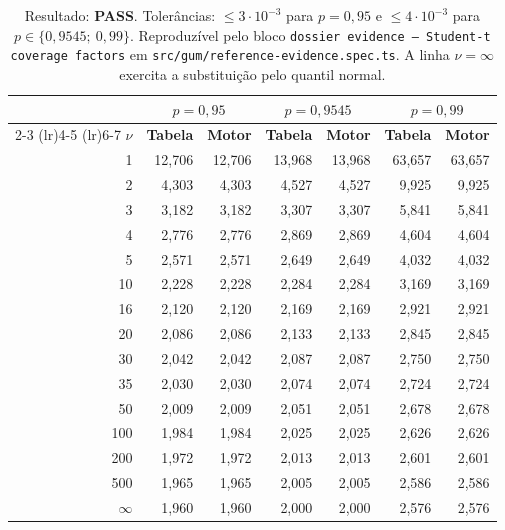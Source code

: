 \documentclass[11pt,a4paper]{article}
\begin{document}
\begin{table}[H]
  \centering
  \small
  \begin{tabularx}{\textwidth}{r r r r r r r}
    \toprule
    & \multicolumn{2}{c}{\(p = 0{,}95\)} & \multicolumn{2}{c}{\(p = 0{,}9545\)} & \multicolumn{2}{c}{\(p = 0{,}99\)} \\
    \cmidrule(lr){2-3} \cmidrule(lr){4-5} \cmidrule(lr){6-7}
    \(\nu\) & \textbf{Tabela} & \textbf{Motor} & \textbf{Tabela} & \textbf{Motor} & \textbf{Tabela} & \textbf{Motor} \\
    \midrule
    1   & 12,706 & 12,706 & 13,968 & 13,968 & 63,657 & 63,657 \\
    2   & 4,303  & 4,303  & 4,527  & 4,527  & 9,925  & 9,925 \\
    3   & 3,182  & 3,182  & 3,307  & 3,307  & 5,841  & 5,841 \\
    4   & 2,776  & 2,776  & 2,869  & 2,869  & 4,604  & 4,604 \\
    5   & 2,571  & 2,571  & 2,649  & 2,649  & 4,032  & 4,032 \\
    10  & 2,228  & 2,228  & 2,284  & 2,284  & 3,169  & 3,169 \\
    16  & 2,120  & 2,120  & 2,169  & 2,169  & 2,921  & 2,921 \\
    20  & 2,086  & 2,086  & 2,133  & 2,133  & 2,845  & 2,845 \\
    30  & 2,042  & 2,042  & 2,087  & 2,087  & 2,750  & 2,750 \\
    35  & 2,030  & 2,030  & 2,074  & 2,074  & 2,724  & 2,724 \\
    50  & 2,009  & 2,009  & 2,051  & 2,051  & 2,678  & 2,678 \\
    100 & 1,984  & 1,984  & 2,025  & 2,025  & 2,626  & 2,626 \\
    200 & 1,972  & 1,972  & 2,013  & 2,013  & 2,601  & 2,601 \\
    500 & 1,965  & 1,965  & 2,005  & 2,005  & 2,586  & 2,586 \\
    \(\infty\) & 1,960 & 1,960 & 2,000 & 2,000 & 2,576 & 2,576 \\
    \bottomrule
  \end{tabularx}
  \caption*{\small Resultado: \textbf{PASS}. Tolerâncias: \(\leq 3 \cdot 10^{-3}\) para \(p = 0{,}95\) e \(\leq 4 \cdot 10^{-3}\) para \(p \in \{0{,}9545;\ 0{,}99\}\). Reproduzível pelo bloco \texttt{dossier evidence --- Student-t coverage factors} em \texttt{src/gum/reference-evidence.spec.ts}. A linha \(\nu = \infty\) exercita a substituição pelo quantil normal.}
\end{table}
\end{document}

